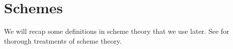 \section{Schemes}
We will recap some definitions in scheme theory that we use later.
See \cite{vakil,harts} for thorough treatments of scheme theory.





